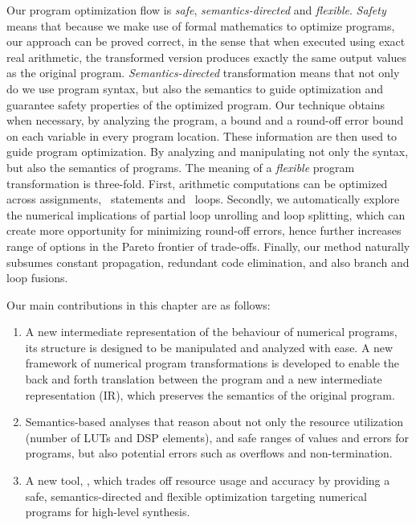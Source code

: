 Our program optimization flow is \emph{safe}, \emph{semantics-directed} and
\emph{flexible}. \emph{Safety} means that because we make use of formal
mathematics to optimize programs, our approach can be proved correct, in
the sense that when executed using exact real arithmetic, the transformed
version produces exactly the same output values as the original program.
\emph{Semantics-directed} transformation means that not only do we use
program syntax, but also the semantics to guide optimization and guarantee
safety properties of the optimized program.  Our technique obtains when
necessary, by analyzing the program, a bound and a round-off error bound on
each variable in every program location.  These information are then used
to guide program optimization.  By analyzing and manipulating not only the
syntax, but also the semantics of programs.  The meaning of a \emph{flexible}
program transformation is three-fold.  First, arithmetic computations can be
optimized across assignments, \iflit~statements and \whilelit~loops.  Secondly,
we automatically explore the numerical implications of partial loop unrolling
and loop splitting, which can create more opportunity for minimizing round-off
errors, hence further increases range of options in the Pareto frontier of
trade-offs.  Finally, our method naturally subsumes constant propagation,
redundant code elimination, and also branch and loop fusions.


Our main contributions in this chapter are as follows:
\begin{enumerate}
    \vspace{-6pt}
    \item
        A new intermediate representation of the behaviour of numerical
        programs, its structure is designed to be manipulated and analyzed
        with ease.  A new framework of numerical program transformations is
        developed to enable the back and forth translation between the program
        and a new intermediate representation (IR), which preserves the
        semantics of the original program.
    \vspace{-6pt}
    \item
        Semantics-based analyses that reason about not only the resource
        utilization (number of LUTs and DSP elements), and safe ranges of
        values and errors for programs, but also potential errors such as
        overflows and non-termination.
    \vspace{-6pt}
    \item
        A new tool, \newsoap, which trades off resource usage and accuracy
        by providing a safe, semantics-directed and flexible optimization
        targeting numerical programs for high-level synthesis.
    \vspace{-6pt}
\end{enumerate}

